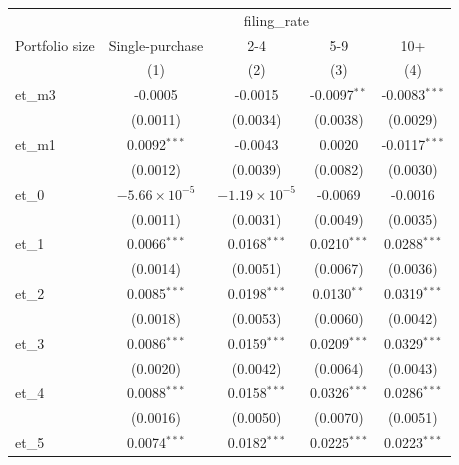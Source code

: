 
\begingroup
\centering
\begin{tabular}{lcccc}
   \toprule
    & \multicolumn{4}{c}{filing\_rate}\\
   Portfolio size     & Single-purchase        & 2-4                    & 5-9            & 10+ \\   
                      & (1)                    & (2)                    & (3)            & (4)\\  
   \midrule 
   et\_m3             & -0.0005                & -0.0015                & -0.0097$^{**}$ & -0.0083$^{***}$\\   
                      & (0.0011)               & (0.0034)               & (0.0038)       & (0.0029)\\   
   et\_m1             & 0.0092$^{***}$         & -0.0043                & 0.0020         & -0.0117$^{***}$\\   
                      & (0.0012)               & (0.0039)               & (0.0082)       & (0.0030)\\   
   et\_0              & $-5.66\times 10^{-5}$  & $-1.19\times 10^{-5}$  & -0.0069        & -0.0016\\   
                      & (0.0011)               & (0.0031)               & (0.0049)       & (0.0035)\\   
   et\_1              & 0.0066$^{***}$         & 0.0168$^{***}$         & 0.0210$^{***}$ & 0.0288$^{***}$\\   
                      & (0.0014)               & (0.0051)               & (0.0067)       & (0.0036)\\   
   et\_2              & 0.0085$^{***}$         & 0.0198$^{***}$         & 0.0130$^{**}$  & 0.0319$^{***}$\\   
                      & (0.0018)               & (0.0053)               & (0.0060)       & (0.0042)\\   
   et\_3              & 0.0086$^{***}$         & 0.0159$^{***}$         & 0.0209$^{***}$ & 0.0329$^{***}$\\   
                      & (0.0020)               & (0.0042)               & (0.0064)       & (0.0043)\\   
   et\_4              & 0.0088$^{***}$         & 0.0158$^{***}$         & 0.0326$^{***}$ & 0.0286$^{***}$\\   
                      & (0.0016)               & (0.0050)               & (0.0070)       & (0.0051)\\   
   et\_5              & 0.0074$^{***}$         & 0.0182$^{***}$         & 0.0225$^{***}$ & 0.0223$^{***}$\\   

\end{tabular}
